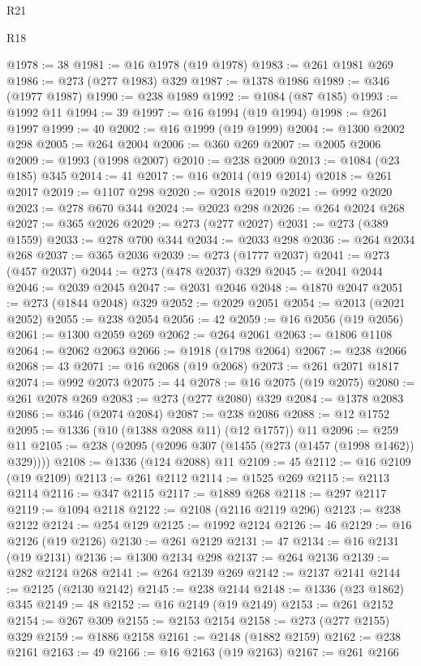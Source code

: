 \begin{lexlean}{R21}
\begin{lexlean}{R18}
\begin{coremodule}
{{{{{{{{{{{{{{{{{{{{{{{{{{{{{{{{{{{{{{{{{{{{{{{{{{{{{{{{{{{{{{{{{{{{{{{{{{{{{{{{{{{{{{{{{{{{{{{{{{{{{{{{{{{{{{{{{{{{{{{{{{{{{{{{{{{{{{{{{{{{{{{@1978 := 38
@1981 := @16 @1978 (@19 @1978)
@1983 := @261 @1981 @269
@1986 := @273 (@277 @1983) @329
@1987 := @1378 @1986
@1989 := @346 (@1977 @1987)
@1990 := @238 @1989
@1992 := @1084 (@87 @185)
@1993 := @1992 @11
@1994 := 39
@1997 := @16 @1994 (@19 @1994)
@1998 := @261 @1997
@1999 := 40
@2002 := @16 @1999 (@19 @1999)
@2004 := @1300 @2002 @298
@2005 := @264 @2004
@2006 := @360 @269
@2007 := @2005 @2006
@2009 := @1993 (@1998 @2007)
@2010 := @238 @2009
@2013 := @1084 (@23 @185) @345
@2014 := 41
@2017 := @16 @2014 (@19 @2014)
@2018 := @261 @2017
@2019 := @1107 @298
@2020 := @2018 @2019
@2021 := @992 @2020
@2023 := @278 @670 @344
@2024 := @2023 @298
@2026 := @264 @2024 @268
@2027 := @365 @2026
@2029 := @273 (@277 @2027)
@2031 := @273 (@389 @1559)
@2033 := @278 @700 @344
@2034 := @2033 @298
@2036 := @264 @2034 @268
@2037 := @365 @2036
@2039 := @273 (@1777 @2037)
@2041 := @273 (@457 @2037)
@2044 := @273 (@478 @2037) @329
@2045 := @2041 @2044
@2046 := @2039 @2045
@2047 := @2031 @2046
@2048 := @1870 @2047
@2051 := @273 (@1844 @2048) @329
@2052 := @2029 @2051
@2054 := @2013 (@2021 @2052)
@2055 := @238 @2054
@2056 := 42
@2059 := @16 @2056 (@19 @2056)
@2061 := @1300 @2059 @269
@2062 := @264 @2061
@2063 := @1806 @1108
@2064 := @2062 @2063
@2066 := @1918 (@1798 @2064)
@2067 := @238 @2066
@2068 := 43
@2071 := @16 @2068 (@19 @2068)
@2073 := @261 @2071 @1817
@2074 := @992 @2073
@2075 := 44
@2078 := @16 @2075 (@19 @2075)
@2080 := @261 @2078 @269
@2083 := @273 (@277 @2080) @329
@2084 := @1378 @2083
@2086 := @346 (@2074 @2084)
@2087 := @238 @2086
@2088 := @12 @1752
@2095 := @1336 (@10 (@1388 @2088 @11) (@12 @1757)) @11
@2096 := @259 @11
@2105 := @238 (@2095 (@2096 @307 (@1455 (@273 (@1457 (@1998 @1462)) @329))))
@2108 := @1336 (@124 @2088) @11
@2109 := 45
@2112 := @16 @2109 (@19 @2109)
@2113 := @261 @2112
@2114 := @1525 @269
@2115 := @2113 @2114
@2116 := @347 @2115
@2117 := @1889 @268
@2118 := @297 @2117
@2119 := @1094 @2118
@2122 := @2108 (@2116 @2119 @296)
@2123 := @238 @2122
@2124 := @254 @129
@2125 := @1992 @2124
@2126 := 46
@2129 := @16 @2126 (@19 @2126)
@2130 := @261 @2129
@2131 := 47
@2134 := @16 @2131 (@19 @2131)
@2136 := @1300 @2134 @298
@2137 := @264 @2136
@2139 := @282 @2124 @268
@2141 := @264 @2139 @269
@2142 := @2137 @2141
@2144 := @2125 (@2130 @2142)
@2145 := @238 @2144
@2148 := @1336 (@23 @1862) @345
@2149 := 48
@2152 := @16 @2149 (@19 @2149)
@2153 := @261 @2152
@2154 := @267 @309
@2155 := @2153 @2154
@2158 := @273 (@277 @2155) @329
@2159 := @1886 @2158
@2161 := @2148 (@1882 @2159)
@2162 := @238 @2161
@2163 := 49
@2166 := @16 @2163 (@19 @2163)
@2167 := @261 @2166
}}}}}}}}}}}}}}}}}}}}}}}}}}}}}}}}}}}}}}}}}}}}}}}}}}}}}}}}}}}}}}}}}}}}}}}}}}}}}}}}}}}}}}}}}}}}}}}}}}}}}}}}}}}}}}}}}}}}}}}}}}}}}}}}}}}}}}}}}}}}}}}
\end{coremodule}
\end{lexlean}
\end{lexlean}
